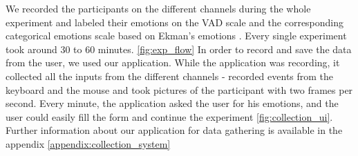 \documentclass[../main.tex]{subfiles}
\begin{document}
We recorded the participants on the different channels during the whole experiment and labeled their emotions on the VAD scale \cite{VAD_model} 
and the corresponding categorical emotions scale based on Ekman's emotions \cite{Ekman_Theory}. 
Every single experiment took around 30 to 60 minutes. \ref{fig:exp_flow}
In order to record and save the data from the user, 
we used our application. While the application was recording, it collected all the inputs from the different channels - recorded events from the keyboard 
and the mouse and took pictures of the participant with two frames per second. Every minute, 
the application asked the user for his emotions, and the user could easily fill the form and continue the experiment \ref{fig:collection_ui}. 
Further information about our application for data gathering is available in the appendix \ref{appendix:collection_system}
\end{document}
